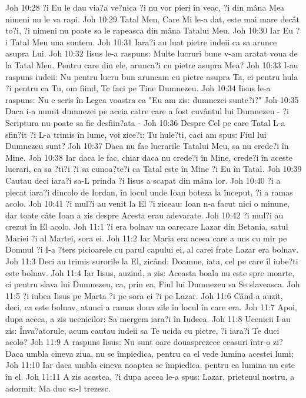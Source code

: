 Joh 10:28  ?i Eu le dau via?a ve?nica ?i nu vor pieri în veac, ?i din mâna Mea nimeni nu le va rapi.
Joh 10:29  Tatal Meu, Care Mi le-a dat, este mai mare decât to?i, ?i nimeni nu poate sa le rapeasca din mâna Tatalui Meu.
Joh 10:30  Iar Eu ?i Tatal Meu una suntem.
Joh 10:31  Iara?i au luat pietre iudeii ca sa arunce asupra Lui.
Joh 10:32  Iisus le-a raspuns: Multe lucruri bune v-am aratat voua de la Tatal Meu. Pentru care din ele, arunca?i cu pietre asupra Mea?
Joh 10:33  I-au raspuns iudeii: Nu pentru lucru bun aruncam cu pietre asupra Ta, ci pentru hula ?i pentru ca Tu, om fiind, Te faci pe Tine Dumnezeu.
Joh 10:34  Iisus le-a raspuns: Nu e scris în Legea voastra ca "Eu am zis: dumnezei sunte?i?"
Joh 10:35  Daca i-a numit dumnezei pe aceia catre care a fost cuvântul lui Dumnezeu - ?i Scriptura nu poate sa fie desfiin?ata -
Joh 10:36  Despre Cel pe care Tatal L-a sfin?it ?i L-a trimis în lume, voi zice?i: Tu hule?ti, caci am spus: Fiul lui Dumnezeu sunt?
Joh 10:37  Daca nu fac lucrarile Tatalui Meu, sa nu crede?i în Mine.
Joh 10:38  Iar daca le fac, chiar daca nu crede?i în Mine, crede?i în aceste lucrari, ca sa ?ti?i ?i sa cunoa?te?i ca Tatal este în Mine ?i Eu în Tatal.
Joh 10:39  Cautau deci iara?i sa-L prinda ?i Iisus a scapat din mâna lor.
Joh 10:40  ?i a plecat iara?i dincolo de Iordan, în locul unde Ioan boteza la început, ?i a ramas acolo.
Joh 10:41  ?i mul?i au venit la El ?i ziceau: Ioan n-a facut nici o minune, dar toate câte Ioan a zis despre Acesta erau adevarate.
Joh 10:42  ?i mul?i au crezut în El acolo.
Joh 11:1  ?i era bolnav un oarecare Lazar din Betania, satul Mariei ?i al Martei, sora ei.
Joh 11:2  Iar Maria era aceea care a uns cu mir pe Domnul ?i I-a ?ters picioarele cu parul capului ei, al carei frate Lazar era bolnav.
Joh 11:3  Deci au trimis surorile la El, zicând: Doamne, iata, cel pe care îl iube?ti este bolnav.
Joh 11:4  Iar Iisus, auzind, a zis: Aceasta boala nu este spre moarte, ci pentru slava lui Dumnezeu, ca, prin ea, Fiul lui Dumnezeu sa Se slaveasca.
Joh 11:5  ?i iubea Iisus pe Marta ?i pe sora ei ?i pe Lazar.
Joh 11:6  Când a auzit, deci, ca este bolnav, atunci a ramas doua zile în locul în care era.
Joh 11:7  Apoi, dupa aceea, a zis ucenicilor: Sa mergem iara?i în Iudeea.
Joh 11:8  Ucenicii I-au zis: Înva?atorule, acum cautau iudeii sa Te ucida cu pietre, ?i iara?i Te duci acolo?
Joh 11:9  A raspuns Iisus: Nu sunt oare douasprezece ceasuri într-o zi? Daca umbla cineva ziua, nu se împiedica, pentru ca el vede lumina acestei lumi;
Joh 11:10  Iar daca umbla cineva noaptea se împiedica, pentru ca lumina nu este în el.
Joh 11:11  A zis acestea, ?i dupa aceea le-a spus: Lazar, prietenul nostru, a adormit; Ma duc sa-l trezesc.
